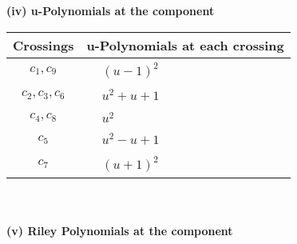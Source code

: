 \documentclass[1p]{elsarticle_modified}
\theoremstyle{definition}
\begin{document}
\newpage\renewcommand{\arraystretch}{1}
\flushleft \textbf{(iv) u-Polynomials at the component}\newline \\
\begin{tabular}{m{50pt}|m{274pt}}
Crossings & \hspace{64pt}u-Polynomials at each crossing \\
\hline $$\begin{aligned}c_{1},c_{9}\end{aligned}$$&$\begin{aligned}
&(u-1)^2
\end{aligned}$\\
\hline $$\begin{aligned}c_{2},c_{3},c_{6}\end{aligned}$$&$\begin{aligned}
&u^2+u+1
\end{aligned}$\\
\hline $$\begin{aligned}c_{4},c_{8}\end{aligned}$$&$\begin{aligned}
&u^2
\end{aligned}$\\
\hline $$\begin{aligned}c_{5}\end{aligned}$$&$\begin{aligned}
&u^2- u+1
\end{aligned}$\\
\hline $$\begin{aligned}c_{7}\end{aligned}$$&$\begin{aligned}
&(u+1)^2
\end{aligned}$\\
\hline
\end{tabular}\\~\\
\newpage\renewcommand{\arraystretch}{1}
\flushleft \textbf{(v) Riley Polynomials at the component}\newline \\
\end{document}
